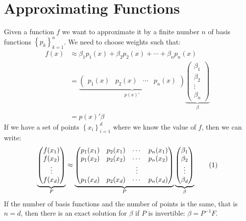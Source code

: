 \documentclass[12pt, a4paper]{article}
\newcommand\numberthis{\addtocounter{equation}{1}\tag{\theequation}}
\newcommand{\Set}[1]{\left\{#1\right\}}
\begin{document}
\section{Approximating Functions}
\label{sec:org68f9387}
Given a function \(f\) we want to approximate it by a finite number \(n\) of basis functions \(\Set{p_k}_{k=1}^n\).
We need to choose weights such that:
\begin{align*}
  f(x)&\approx \beta_1 p_1(x) + \beta_2 p_2(x) + \cdots + \beta_n p_n(x)\\
      &=\underbrace{\begin{pmatrix}
        p_1(x) & p_2(x) & \cdots & p_n(x)
      \end{pmatrix}}_{p(x)'}\underbrace{\begin{pmatrix}
        \beta_1\\
        \beta_2\\
        \vdots\\
        \beta_n
      \end{pmatrix}}_{\beta}\\
  &=p(x)'\beta
\end{align*}
If we have a set of points \(\Set{x_i}_{i=1}^d\) where we know the value of \(f\), then we can write:
\begin{align*}
  \underbrace{\begin{pmatrix}
    f(x_1)\\
    f(x_2)\\
    \vdots\\
    f(x_d)
  \end{pmatrix}}_{F}\approx
  \underbrace{\begin{pmatrix}
    p_1(x_1) & p_2(x_1) & \cdots & p_n(x_1)\\
    p_1(x_2) & p_2(x_2) & \cdots & p_n(x_2)\\
    & & \vdots & \\
    p_1(x_d) & p_2(x_d) & \cdots & p_n(x_d)\\
  \end{pmatrix}}_{P}
  \underbrace{\begin{pmatrix}
    \beta_1\\
    \beta_2\\
    \vdots\\
    \beta_d
  \end{pmatrix}}_{\beta}\numberthis{}\label{eq:890_matlab_FPbeta}
\end{align*}
If the number of basis functions and the number of points is the same, that is \(n=d\), then there is an exact solution for \(\beta\) if \(P\) is invertible: \(\beta=P^{-1}F\).
\end{document}
